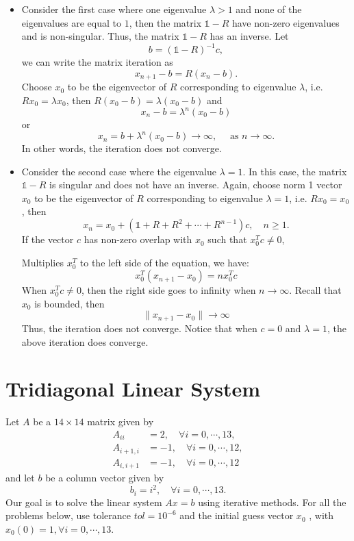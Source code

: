 \documentclass[paper=a4, fontsize=11pt]{scrartcl} %
\numberwithin{equation}{section} %
\numberwithin{figure}{section} %
\numberwithin{table}{section} %
\begin{document}
\begin{itemize}
\item Consider the first case where one eigenvalue $\lambda>1$ and none of the eigenvalues are equal to $1$, then the
matrix $\mathbb{1}-R$ have non-zero eigenvalues and is non-singular. Thus, the
matrix $\mathbb{1}-R$ has an inverse. Let
$$
b = (\mathbb{1}-R)^{-1} c,
$$
we can write the matrix iteration as
$$
x_{n+1}-b = R(x_n -b).
$$
Choose $x_0$ to be the eigenvector of $R$ corresponding to eigenvalue $\lambda$, i.e. $Rx_0 = \lambda x_0$, then
$R(x_0 -b) = \lambda(x_0 -b)$ and
$$
x_{n}-b = \lambda^n(x_0 -b) 
$$
or
$$
x_n = b + \lambda^n(x_0 -b)\rightarrow \infty, \quad \text{ as } n\rightarrow \infty.
$$
In other words, the iteration does not converge.

\item Consider the second case where the eigenvalue $\lambda = 1$. In this case, the matrix $\mathbb{1}-R$
is singular and does not have an inverse. Again, choose norm 1 vector $x_0$ to be the eigenvector of $R$ corresponding to eigenvalue $\lambda=1$, 
i.e. $Rx_0 = x_0$, then
$$
x_n = x_0 + \left(\mathbb{1}+R+R^2+\cdots+R^{n-1}\right)c, \quad n\ge 1.
$$
If the vector $c$ has non-zero overlap with $x_0$ such that $x_0^T c\neq 0$,

Multiplies $x_0^T$ to the left side of the equation, we have:
$$
x_0^T (x_{n+1}-x_0) = n x_0^T c
$$
When $x_0^T c\neq 0$, then the right side goes to infinity when $n \to \infty$. Recall that $x_0$ is bounded, then
$$
\parallel x_{n+1}-x_0 \parallel \to \infty
$$
Thus, the iteration does not converge.
Notice that when $c=0$ and $\lambda =1$, the above iteration does converge.
\end{itemize} 

\newpage

\section{Tridiagonal Linear System}
Let $A$ be a $14\times 14$ matrix given by
\begin{align}
\nonumber A_{ii} &= 2, \quad \forall i=0,\cdots,13,\\
\nonumber A_{i+1,i} &= -1, \quad \forall i=0,\cdots,12,\\
\nonumber A_{i,i+1} &= -1, \quad \forall i=0,\cdots,12
\end{align}
and let $b$ be a column vector given by
$$
b_i = i^2, \quad \forall i=0,\cdots,13.
$$
Our goal is to solve the linear system $Ax = b$ using iterative methods. For all the
problems below, use tolerance $tol = 10^{-6}$ and the initial guess vector $x_0$ , with $x_0(0) =
1, \forall i = 0,\cdots,13$.\\
\end{document}
